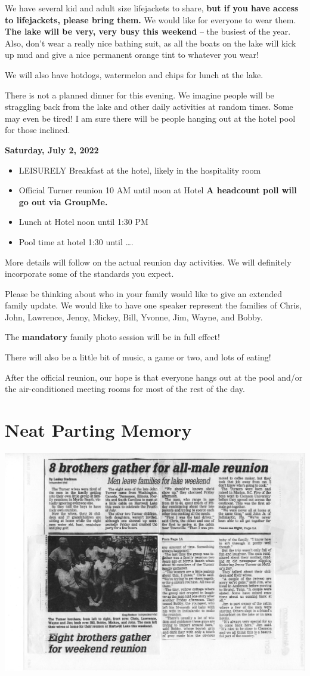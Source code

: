 \documentclass[
]{book}
\providecommand{\tightlist}{%
  \setlength{\itemsep}{0pt}\setlength{\parskip}{0pt}}
\begin{document}
We have several kid and adult size lifejackets to share, \textbf{but if you have access to lifejackets, please bring them.} We would like for everyone to wear them. \textbf{The lake will be very, very busy this weekend} -- the busiest of the year. Also, don't wear a really nice bathing suit, as all the boats on the lake will kick up mud and give a nice permanent orange tint to whatever you wear!

We will also have hotdogs, watermelon and chips for lunch at the lake.

There is not a planned dinner for this evening. We imagine people will be straggling back from the lake and other daily activities at random times. Some may even be tired! I am sure there will be people hanging out at the hotel pool for those inclined.

\textbf{Saturday, July 2, 2022}

\begin{itemize}
\tightlist
\item
  LEISURELY Breakfast at the hotel, likely in the hospitality room
\item
  Official Turner reunion 10 AM until noon at Hotel \textbf{A headcount poll will go out via GroupMe.}
\item
  Lunch at Hotel noon until 1:30 PM
\item
  Pool time at hotel 1:30 until \ldots.
\end{itemize}

More details will follow on the actual reunion day activities. We will definitely incorporate some of the standards you expect.

Please be thinking about who in your family would like to give an extended family update. We would like to have one speaker represent the families of Chris, John, Lawrence, Jenny, Mickey, Bill, Yvonne, Jim, Wayne, and Bobby.

The \textbf{mandatory} family photo session will be in full effect!

There will also be a little bit of music, a game or two, and lots of eating!

After the official reunion, our hope is that everyone hangs out at the pool and/or the air-conditioned meeting rooms for most of the rest of the day.

\hypertarget{neat-parting-memory}{%
\section*{Neat Parting Memory}\label{neat-parting-memory}}

\includegraphics[width=1\linewidth]{images/brothers}
\end{document}
